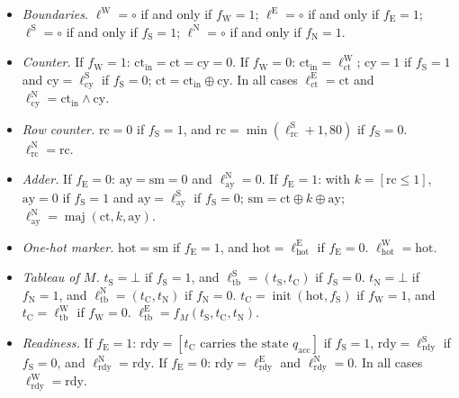 \begin{itemize}
\item[(C0)] \emph{Boundaries.} $\ell^{\mathrm W}=\circ$ if and only if $f_{\mathrm W}=1$; $\ell^{\mathrm E}=\circ$ if and only if $f_{\mathrm E}=1$; $\ell^{\mathrm S}=\circ$ if and only if $f_{\mathrm S}=1$; $\ell^{\mathrm N}=\circ$ if and only if $f_{\mathrm N}=1$.
\item[(C1)] \emph{Counter.} If $f_{\mathrm W}=1$: $\mathrm{ct}_{\mathrm{in}}=\mathrm{ct}=\mathrm{cy}=0$. If $f_{\mathrm W}=0$: $\mathrm{ct}_{\mathrm{in}}=\ell^{\mathrm W}_{\mathrm{ct}}$; $\mathrm{cy}=1$ if $f_{\mathrm S}=1$ and $\mathrm{cy}=\ell^{\mathrm S}_{\mathrm{cy}}$ if $f_{\mathrm S}=0$; $\mathrm{ct}=\mathrm{ct}_{\mathrm{in}}\oplus\mathrm{cy}$. In all cases $\ell^{\mathrm E}_{\mathrm{ct}}=\mathrm{ct}$ and $\ell^{\mathrm N}_{\mathrm{cy}}=\mathrm{ct}_{\mathrm{in}}\wedge\mathrm{cy}$.
\item[(C2)] \emph{Row counter.} $\mathrm{rc}=0$ if $f_{\mathrm S}=1$, and $\mathrm{rc}=\min(\ell^{\mathrm S}_{\mathrm{rc}}+1,80)$ if $f_{\mathrm S}=0$. $\ell^{\mathrm N}_{\mathrm{rc}}=\mathrm{rc}$.
\item[(C3)] \emph{Adder.} If $f_{\mathrm E}=0$: $\mathrm{ay}=\mathrm{sm}=0$ and $\ell^{\mathrm N}_{\mathrm{ay}}=0$. If $f_{\mathrm E}=1$: with $k=[\mathrm{rc}\le1]$, $\mathrm{ay}=0$ if $f_{\mathrm S}=1$ and $\mathrm{ay}=\ell^{\mathrm S}_{\mathrm{ay}}$ if $f_{\mathrm S}=0$; $\mathrm{sm}=\mathrm{ct}\oplus k\oplus\mathrm{ay}$; $\ell^{\mathrm N}_{\mathrm{ay}}=\operatorname{maj}(\mathrm{ct},k,\mathrm{ay})$.
\item[(C4)] \emph{One-hot marker.} $\mathrm{hot}=\mathrm{sm}$ if $f_{\mathrm E}=1$, and $\mathrm{hot}=\ell^{\mathrm E}_{\mathrm{hot}}$ if $f_{\mathrm E}=0$. $\ell^{\mathrm W}_{\mathrm{hot}}=\mathrm{hot}$.
\item[(C5)] \emph{Tableau of $M$.} $t_{\mathrm S}=\bot$ if $f_{\mathrm S}=1$, and $\ell^{\mathrm S}_{\mathrm{tb}}=(t_{\mathrm S},t_{\mathrm C})$ if $f_{\mathrm S}=0$. $t_{\mathrm N}=\bot$ if $f_{\mathrm N}=1$, and $\ell^{\mathrm N}_{\mathrm{tb}}=(t_{\mathrm C},t_{\mathrm N})$ if $f_{\mathrm N}=0$. $t_{\mathrm C}=\operatorname{init}(\mathrm{hot},f_{\mathrm S})$ if $f_{\mathrm W}=1$, and $t_{\mathrm C}=\ell^{\mathrm W}_{\mathrm{tb}}$ if $f_{\mathrm W}=0$. $\ell^{\mathrm E}_{\mathrm{tb}}=f_M(t_{\mathrm S},t_{\mathrm C},t_{\mathrm N})$.
\item[(C6)] \emph{Readiness.} If $f_{\mathrm E}=1$: $\mathrm{rdy}=[t_{\mathrm C}\text{ carries the state }q_{\mathrm{acc}}]$ if $f_{\mathrm S}=1$, $\mathrm{rdy}=\ell^{\mathrm S}_{\mathrm{rdy}}$ if $f_{\mathrm S}=0$, and $\ell^{\mathrm N}_{\mathrm{rdy}}=\mathrm{rdy}$. If $f_{\mathrm E}=0$: $\mathrm{rdy}=\ell^{\mathrm E}_{\mathrm{rdy}}$ and $\ell^{\mathrm N}_{\mathrm{rdy}}=0$. In all cases $\ell^{\mathrm W}_{\mathrm{rdy}}=\mathrm{rdy}$.

\end{itemize}
